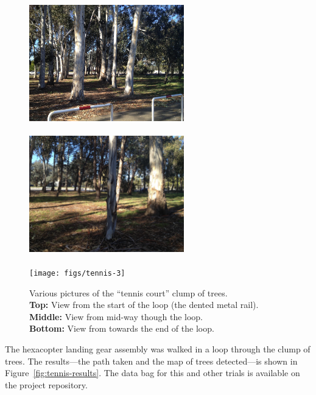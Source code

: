 \documentclass[12pt,oneside,a4paper,draft]{book}
\begin{document}
\begin{figure}
  \centering
  \includegraphics[width=0.6\textwidth]{figs/tennis-1}\\
  ~\\
  \includegraphics[width=0.6\textwidth]{figs/tennis-2}\\
  ~\\
  \texttt{[image: figs/tennis-3]}\\
  \caption{Various pictures of the ``tennis court'' clump of trees.\\
  \textbf{Top:} View from the start of the loop (the dented metal
  rail).\\
  \textbf{Middle:} View from mid-way though the loop.\\
  \textbf{Bottom:} View from towards the end of the loop.}
  \label{fig:tennis-trees}
\end{figure}

The hexacopter landing gear assembly was walked in a loop through the
clump of trees. The results---the path taken and the map of trees
detected---is shown in Figure~\ref{fig:tennis-results}. The data bag
for this and other trials is available on the project repository.
\end{document}
